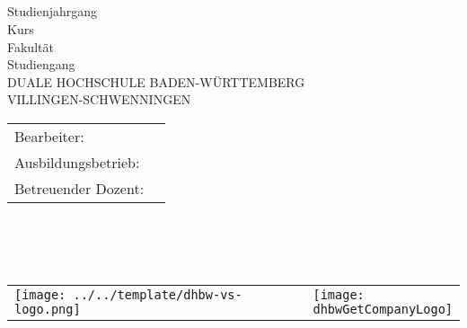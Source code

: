 
\begin{center}
\vspace*{1cm} \ \\
{\fontsize{40}{48}\selectfont \bfseries \dhbwGetTitle \\}
\vspace{0.75cm}
{\Large\bfseries \dhbwGetSubtitle \\}
\vspace{1.5cm}
\dhbwGetTextType \\
Studienjahrgang \dhbwGetAcademicYear \\
Kurs \dhbwGetCourse \\
\vspace{1.5cm}
Fakultät \dhbwGetFaculty \\
Studiengang \dhbwGetFieldOfStudy \\
DUALE HOCHSCHULE BADEN-WÜRTTEMBERG\\
VILLINGEN-SCHWENNINGEN\\
\end{center}
\begin{table}[b]
\begin{tabular}{ll}
Bearbeiter: 		&	\dhbwGetAuthor \\
Ausbildungsbetrieb:	&	\dhbwGetCompanyName \\
Betreuender Dozent:	&	\dhbwGetLecturer \\
\end{tabular}\\
\\
\\
\begin{tabularx}{\textwidth}{lXl}
\texttt{[image: ../../template/dhbw-vs-logo.png]} &
&
\raisebox{\height}{\texttt{[image: \\dhbwGetCompanyLogo]} }
\end{tabularx}
\end{table}

\restoregeometry
